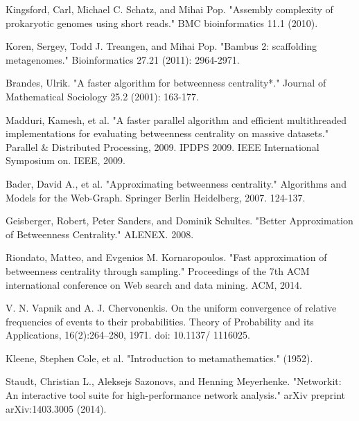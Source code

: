 \documentclass[runningheads,a4paper]{llncs}
\begin{document}
\begin{thebibliography}{4}


 Kingsford, Carl, Michael C. Schatz, and Mihai Pop. "Assembly complexity of prokaryotic genomes using short reads." BMC bioinformatics 11.1 (2010).

 Koren, Sergey, Todd J. Treangen, and Mihai Pop. "Bambus 2: scaffolding metagenomes." Bioinformatics 27.21 (2011): 2964-2971.

 Brandes, Ulrik. "A faster algorithm for betweenness centrality*." Journal of Mathematical Sociology 25.2 (2001): 163-177.

 Madduri, Kamesh, et al. "A faster parallel algorithm and efficient multithreaded implementations for evaluating betweenness centrality on massive datasets." Parallel \& Distributed Processing, 2009. IPDPS 2009. IEEE International Symposium on. IEEE, 2009.

 Bader, David A., et al. "Approximating betweenness centrality." Algorithms and Models for the Web-Graph. Springer Berlin Heidelberg, 2007. 124-137.

Geisberger, Robert, Peter Sanders, and Dominik Schultes. "Better Approximation of Betweenness Centrality." ALENEX. 2008.

 Riondato, Matteo, and Evgenios M. Kornaropoulos. "Fast approximation of betweenness centrality through sampling." Proceedings of the 7th ACM international conference on Web search and data mining. ACM, 2014.

 V. N. Vapnik and A. J. Chervonenkis. On the uniform convergence of relative frequencies of events
to their probabilities. Theory of Probability and its Applications, 16(2):264–280, 1971. doi: 10.1137/
1116025.

 Kleene, Stephen Cole, et al. "Introduction to metamathematics." (1952).

 Staudt, Christian L., Aleksejs Sazonovs, and Henning Meyerhenke. "Networkit: An interactive tool suite for high-performance network analysis." arXiv preprint arXiv:1403.3005 (2014).

\end{thebibliography}
\end{document}
